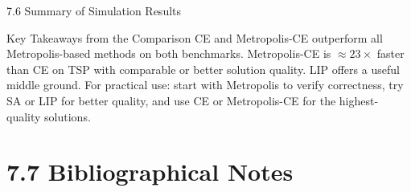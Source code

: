 \documentclass[aspectratio=169,10pt]{beamer}
\begin{document}
\begin{frame}[allowframebreaks]{7.6 Summary of Simulation Results}
\begin{alertblock}{Key Takeaways from the Comparison}
  CE and Metropolis-CE outperform all Metropolis-based methods on both
  benchmarks.  Metropolis-CE is $\approx 23\times$ faster than CE on TSP
  with comparable or better solution quality.  LIP offers a useful middle
  ground.  For practical use: start with Metropolis to verify correctness,
  try SA or LIP for better quality, and use CE or Metropolis-CE for the
  highest-quality solutions.
\end{alertblock}

\end{frame}

\section{7.7 Bibliographical Notes}
\end{document}
